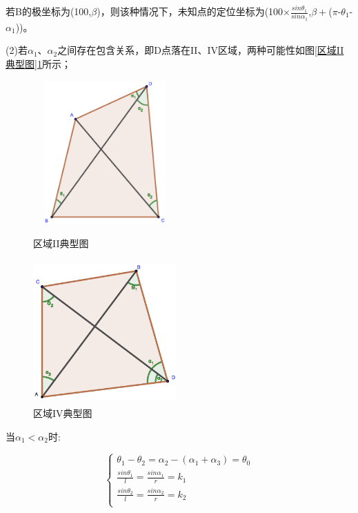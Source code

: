 \documentclass{ctexart}
\begin{document}
若B的极坐标为(100,$\beta$)，则该种情况下，未知点的定位坐标为(100$\times\frac{sin\theta_1}{sin\alpha_1}$,$\beta +$($\pi$-$\theta_1$-$\alpha_1$))。


(2)若$\alpha_1$、$\alpha_2$之间存在包含关系，即D点落在II、IV区域，两种可能性如图\ref{区域II典型图}\ref{区域IV典型图}所示；

\begin{figure}[htbp]
  \begin{minipage}[t]{0.45\linewidth}
  \centering
  \includegraphics[height=5.5cm,width=5.5cm]{pic/case4.eps}
  \caption{区域II典型图}
  \label{区域II典型图}
  \end{minipage}%
  \begin{minipage}[t]{0.45\linewidth}
  \centering
  \includegraphics[height=5.5cm,width=5.5cm]{pic/case2+.eps}
  \caption{区域IV典型图}
  \label{区域IV典型图}
  \end{minipage}
  \end{figure}


当$\alpha_1 < \alpha_2$时:

\begin{equation}
    \left\{
              \begin{array}{ll}
                \theta_1-\theta_2=\alpha_2-(\alpha_1+\alpha_3)=\theta_0\\
                \frac{sin\theta_1}{l}=\frac{sin\alpha_1}{r}=k_1\\
                \frac{sin\theta_2}{l}=\frac{sin\alpha_2}{r}=k_2\\

              \end{array}
            \right.
\end{equation}
\end{document}
